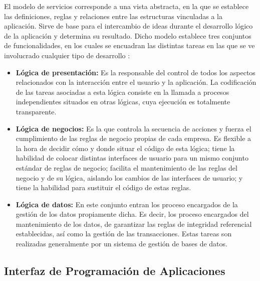 El modelo de servicios corresponde a una vista abstracta, en la que se establece las definiciones, reglas y relaciones entre las estructuras vinculadas a la aplicación. Sirve de base para el intercambio de ideas durante el desarrollo lógico de la aplicación y determina su resultado. Dicho modelo establece tres conjuntos de funcionalidades, en los cuales se encuadran las distintas tareas en las que se ve involucrado cualquier tipo de desarrollo \citep{marini2012}:

\begin{itemize}
\item \textbf{Lógica de presentación:} Es la responsable del control de todos los aspectos relacionados con la interacción entre el usuario y la aplicación. La codificación de las tareas asociadas a esta lógica consiste en la llamada a procesos independientes situados en otras lógicas, cuya ejecución es totalmente transparente.
\item \textbf{Lógica de negocios:} Es la que controla la secuencia de acciones y fuerza el cumplimiento de las reglas de negocio propias de cada empresa. Es flexible a la hora de decidir cómo y donde situar el código de esta lógica; tiene la habilidad de colocar distintas interfaces de usuario para un mismo conjunto estándar de reglas de negocio; facilita el mantenimiento de las reglas del negocio y de su lógica, aislando los cambios de las interfaces de usuario; y tiene la habilidad para sustituir el código de estas reglas.

\item \textbf{Lógica de datos:} En este conjunto entran los proceso encargados de la gestión de los datos propiamente dicha. Es decir, los proceso encargados del mantenimiento de los datos, de garantizar las reglas de integridad referencial establecidas, así como la gestión de las transacciones. Estas tareas son realizadas generalmente por un sistema de gestión de bases de datos.
\end{itemize}

\subsection{Interfaz de Programación de Aplicaciones}

